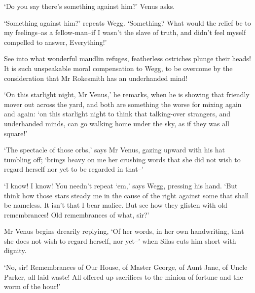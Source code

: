 ‘Do you say there’s something against him?’ Venus asks.

‘Something against him?’ repeats Wegg. ‘Something? What would the relief
be to my feelings--as a fellow-man--if I wasn’t the slave of truth, and
didn’t feel myself compelled to answer, Everything!’

See into what wonderful maudlin refuges, featherless ostriches plunge
their heads! It is such unspeakable moral compensation to Wegg, to be
overcome by the consideration that Mr Rokesmith has an underhanded mind!

‘On this starlight night, Mr Venus,’ he remarks, when he is showing that
friendly mover out across the yard, and both are something the worse
for mixing again and again: ‘on this starlight night to think that
talking-over strangers, and underhanded minds, can go walking home under
the sky, as if they was all square!’

‘The spectacle of those orbs,’ says Mr Venus, gazing upward with his hat
tumbling off; ‘brings heavy on me her crushing words that she did not
wish to regard herself nor yet to be regarded in that--’

‘I know! I know! You needn’t repeat ‘em,’ says Wegg, pressing his hand.
‘But think how those stars steady me in the cause of the right against
some that shall be nameless. It isn’t that I bear malice. But see how
they glisten with old remembrances! Old remembrances of what, sir?’

Mr Venus begins drearily replying, ‘Of her words, in her own
handwriting, that she does not wish to regard herself, nor yet--’ when
Silas cuts him short with dignity.

‘No, sir! Remembrances of Our House, of Master George, of Aunt Jane, of
Uncle Parker, all laid waste! All offered up sacrifices to the minion of
fortune and the worm of the hour!’



